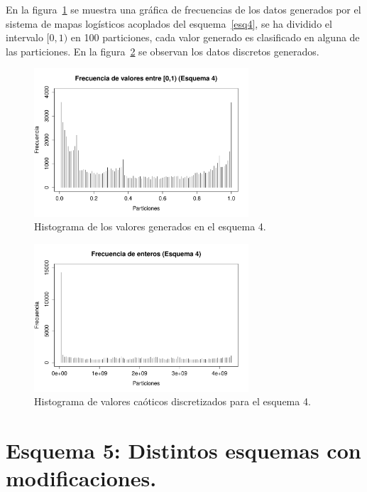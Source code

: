 \documentclass[preprint]{elsarticle}
\begin{document}
En la figura~\ref{papa} se muestra una gráfica de frecuencias de los datos generados por el sistema de mapas logísticos acoplados del esquema~\ref{esq4}, se ha dividido el intervalo $[0,1)$ en 100 particiones, cada valor generado es clasificado en alguna de las particiones. En la figura~\ref{tata} se observan los datos discretos generados.

\begin{figure}[H]  
\centering
\includegraphics[width=8cm]{papa.pdf}
\caption{Histograma de los valores generados en el esquema 4.}
\label{papa}
\end{figure}


\begin{figure}[H]
\centering
\includegraphics[width=8cm]{tata.pdf}
\caption{Histograma de valores caóticos discretizados para el esquema 4.}
\label{tata}
\end{figure}















\section{Esquema 5: Distintos esquemas con modificaciones.}
\label{esq5}
\end{document}
